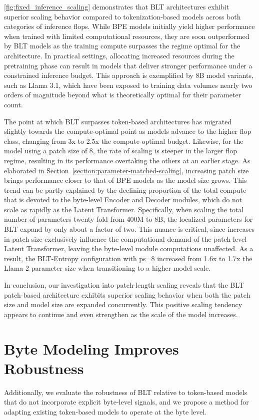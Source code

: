 \autoref{fig:fixed_inference_scaling} demonstrates that {\textsc BLT} architectures exhibit superior scaling behavior compared to tokenization-based models across both categories of inference flops. While BPE models initially yield higher performance when trained with limited computational resources, they are soon outperformed by {\textsc BLT} models as the training compute surpasses the regime optimal for the architecture. In practical settings, allocating increased resources during the pretraining phase can result in models that deliver stronger performance under a constrained inference budget. This approach is exemplified by 8B model variants, such as Llama 3.1, which have been exposed to training data volumes nearly two orders of magnitude beyond what is theoretically optimal for their parameter count.

The point at which {\textsc BLT} surpasses token-based architectures has migrated slightly towards the compute-optimal point as models advance to the higher flop class, changing from 3x to 2.5x the compute-optimal budget. Likewise, for the model using a patch size of 8, the rate of scaling is steeper in the larger flop regime, resulting in its performance overtaking the others at an earlier stage. As elaborated in Section~\ref{section:parameter-matched-scaling}, increasing patch size brings performance closer to that of BPE models as the model size grows. This trend can be partly explained by the declining proportion of the total compute that is devoted to the byte-level Encoder and Decoder modules, which do not scale as rapidly as the Latent Transformer. Specifically, when scaling the total number of parameters twenty-fold from 400M to 8B, the localized parameters for {\textsc BLT} expand by only about a factor of two. This nuance is critical, since increases in patch size exclusively influence the computational demand of the patch-level Latent Transformer, leaving the byte-level module computations unaffected. As a result, the {\textsc BLT}-Entropy configuration with ps=8 increased from 1.6x to 1.7x the Llama 2 parameter size when transitioning to a higher model scale.

In conclusion, our investigation into patch-length scaling reveals that the {\textsc BLT} patch-based architecture exhibits superior scaling behavior when both the patch size and model size are expanded concurrently. This positive scaling tendency appears to continue and even strengthen as the scale of the model increases.

\section{Byte Modeling Improves Robustness} Additionally, we evaluate the robustness of {\textsc BLT} relative to token-based models that do not incorporate explicit byte-level signals, and we propose a method for adapting existing token-based models to operate at the byte level.
\label{sec:robustness}

